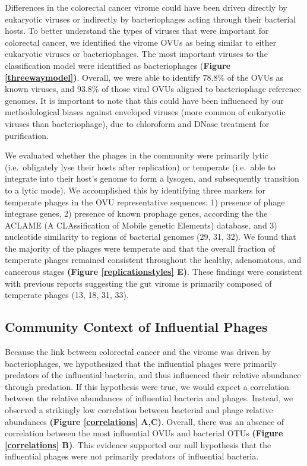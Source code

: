 \documentclass[12pt,]{article}
\begin{document}
Differences in the colorectal cancer virome could have been driven
directly by eukaryotic viruses or indirectly by bacteriophages acting
through their bacterial hosts. To better understand the types of viruses
that were important for colorectal cancer, we identified the virome OVUs
as being similar to either eukaryotic viruses or bacteriophages. The
most important viruses to the classification model were identified as
bacteriophages (\textbf{Figure \ref{threewaymodel})}. Overall, we were
able to identify 78.8\% of the OVUs as known viruses, and 93.8\% of
those viral OVUs aligned to bacteriophage reference genomes. It is
important to note that this could have been influenced by our
methodological biases against enveloped viruses (more common of
eukaryotic viruses than bacteriophage), due to chloroform and DNase
treatment for purification.

We evaluated whether the phages in the community were primarily lytic
(i.e.~obligately lyse their hosts after replication) or temperate
(i.e.~able to integrate into their host's genome to form a lysogen, and
subsequently transition to a lytic mode). We accomplished this by
identifying three markers for temperate phages in the OVU representative
sequences: 1) presence of phage integrase genes, 2) presence of known
prophage genes, according the the ACLAME (A CLAssification of Mobile
genetic Elements) database, and 3) nucleotide similarity to regions of
bacterial genomes (29, 31, 32). We found that the majority of the phages
were temperate and that the overall fraction of temperate phages
remained consistent throughout the healthy, adenomatous, and cancerous
stages \textbf{(Figure \ref{replicationstyles} E)}. These findings were
consistent with previous reports suggesting the gut virome is primarily
composed of temperate phages (13, 18, 31, 33).

\subsection{Community Context of Influential
Phages}\label{community-context-of-influential-phages}

Because the link between colorectal cancer and the virome was driven by
bacteriophages, we hypothesized that the influential phages were
primarily predators of the influential bacteria, and thus influenced
their relative abundance through predation. If this hypothesis were
true, we would expect a correlation between the relative abundances of
influential bacteria and phages. Instead, we observed a strikingly low
correlation between bacterial and phage relative abundances
\textbf{(Figure \ref{correlations} A,C)}. Overall, there was an absence
of correlation between the most influential OVUs and bacterial OTUs
\textbf{(Figure \ref{correlations} B)}. This evidence supported our null
hypothesis that the influential phages were not primarily predators of
influential bacteria.
\end{document}
